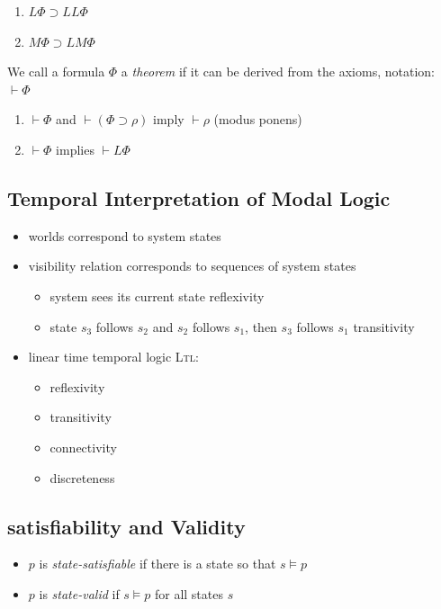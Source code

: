 \documentclass[a4paper, 10pt]{article}
\begin{document}
\begin{shaded}
\begin{multicols}{2}
\begin{enumerate}
        \item $L\Phi\supset LL\Phi$
        \item $M\Phi\supset LM\Phi$
    \end{enumerate}
    \end{multicols}
    We call a formula $\Phi$ a \emph{theorem} if it can be derived from the axioms, notation: $\vdash \Phi$
    \begin{enumerate}
        \item $\vdash\Phi$ and $\vdash(\Phi\supset\rho)$ imply $\vdash\rho$ (modus ponens)
        \item $\vdash\Phi$ implies $\vdash L\Phi$
    \end{enumerate}
\end{shaded}
\subsection*{Temporal Interpretation of Modal Logic}
\begin{itemize}
    \item worlds correspond to system states
    \item visibility relation corresponds to sequences of system states
    \begin{itemize}
        \item system sees its current state \follows reflexivity
        \item state $s_3$ follows $s_2$ and $s_2$ follows $s_1$, then $s_3$ follows $s_1$ \follows transitivity
    \end{itemize}
    \item linear time temporal logic \textsc{Ltl}:
    \begin{multicols}{2}
    \begin{itemize}
        \item reflexivity
        \item transitivity
        \item connectivity
        \item discreteness
    \end{itemize}
    \end{multicols}
\end{itemize}
\subsection*{satisfiability and Validity}
\begin{itemize}
    \item $p$ is \emph{state-satisfiable} if there is a state so that $s\models p$
    \item $p$ is \emph{state-valid} if $s\models p$ for all states $s$
\end{itemize}
\end{document}

